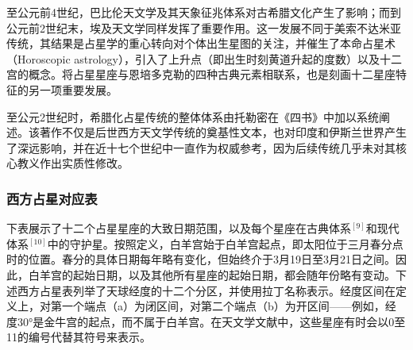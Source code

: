 至公元前4世纪，巴比伦天文学及其天象征兆体系对古希腊文化产生了影响；而到公元前2世纪末，埃及天文学同样发挥了重要作用。这一发展不同于美索不达米亚传统，其结果是占星学的重心转向对个体出生星图的关注，并催生了本命占星术（Horoscopic astrology），引入了上升点（即出生时刻黄道升起的度数）以及十二宫的概念。将占星星座与恩培多克勒的四种古典元素相联系，也是刻画十二星座特征的另一项重要发展。

至公元2世纪时，希腊化占星传统的整体体系由托勒密在《四书》中加以系统阐述。该著作不仅是后世西方天文学传统的奠基性文本，也对印度和伊斯兰世界产生了深远影响，并在近十七个世纪中一直作为权威参考，因为后续传统几乎未对其核心教义作出实质性修改。
\subsubsection{西方占星对应表}  
下表展示了十二个占星星座的大致日期范围，以及每个星座在古典体系$^{[9]}$和现代体系$^{[10]}$中的守护星。按照定义，白羊宫始于白羊宫起点，即太阳位于三月春分点时的位置。春分的具体日期每年略有变化，但始终介于3月19日至3月21日之间。因此，白羊宫的起始日期，以及其他所有星座的起始日期，都会随年份略有变动。下述西方占星表列举了天球经度的十二个分区，并使用拉丁名称表示。经度区间在定义上，对第一个端点（a）为闭区间，对第二个端点（b）为开区间——例如，经度30°是金牛宫的起点，而不属于白羊宫。在天文学文献中，这些星座有时会以0至11的编号代替其符号来表示。

